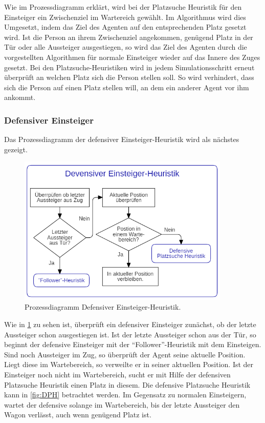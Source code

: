 Wie im Prozessdiagramm erklärt, wird bei der Platzsuche Heuristik für den Einsteiger ein Zwischenziel im Wartereich gewählt. Im Algorithmus wird dies Umgesetzt, indem das Ziel des Agenten auf den entsprechenden Platz gesetzt wird. Ist die Person an ihrem Zwischenziel angekommen, genügend Platz in der Tür oder alle Aussteiger ausgestiegen, so wird das Ziel des Agenten durch die vorgestellten Algorithmen für normale Einsteiger wieder auf das Innere des Zuges gesetzt. Bei den Platzsuche-Heuristiken wird in jedem Simulationsschritt erneut überprüft an welchen Platz sich die Person stellen soll. So wird verhindert, dass sich die Person auf einen Platz stellen will, an dem ein anderer Agent vor ihm ankommt.
\subsubsection{Defensiver Einsteiger}
Das Prozessdiagramm der defensiver Einsteiger-Heuristik wird als nächstes gezeigt.
\begin{figure}[H]
	\centering
		\includegraphics[width=0.9\textwidth]{pictures/model/algorithm/boarding/defensive_boarding/defensive_boarding_heuristic.png}
	\caption{Prozessdiagramm Defensiver Einsteiger-Heuristik.}
	\label{fig:DEH}
\end{figure}
Wie in \figurename \ref{fig:DEH} zu sehen ist, überprüft ein defensiver Einsteiger zunächst, ob der letzte Aussteiger schon ausgestiegen ist.  Ist der letzte Aussteiger schon aus der Tür, so beginnt der defensive Einsteiger mit der "`Follower"'-Heuristik mit dem Einsteigen. Sind noch Aussteiger im Zug, so überprüft der Agent seine aktuelle Position. Liegt diese im Wartebereich, so verweilte er in seiner aktuellen Position. Ist der Einsteiger noch nicht im Wartebereich, sucht er mit Hilfe der defensiven Platzsuche Heuristik einen Platz in diesem. Die defensive Platzsuche Heuristik kann in \figurename \ref{fig:DPH} betrachtet werden. Im Gegensatz zu normalen Einsteigern, wartet der defensive solange im Wartebereich, bis der letzte Aussteiger den Wagon verlässt, auch wenn genügend Platz ist. 

